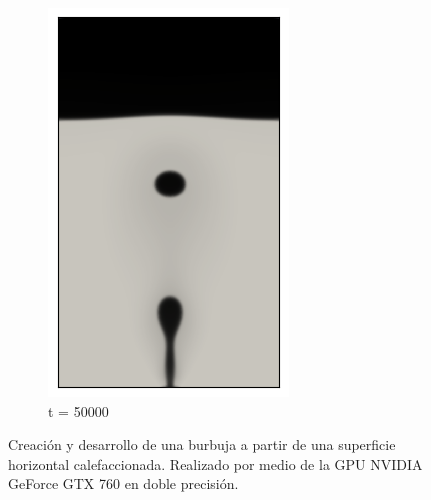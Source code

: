 \begin{figure}[H]
\begin{subfigure}{0.25\textwidth}
		\includegraphics[width=\linewidth]{figs/cap4/cuda_bb_760_d50}
		\caption{t = 50000}
		\label{fig:9}
	\end{subfigure}
	\caption{Creación y desarrollo de una burbuja a partir de una superficie horizontal calefaccionada. Realizado por medio de la GPU NVIDIA GeForce GTX 760 en doble precisión.}
	\label{fig:burbujas_760_doble_cuda}
\end{figure}

\newpage

